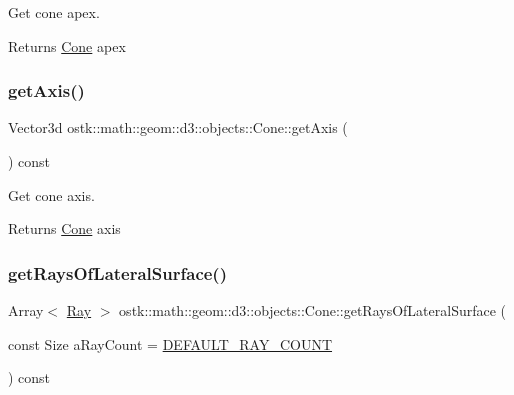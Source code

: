 Get cone apex. 

\begin{DoxyReturn}{Returns}
\hyperlink{classostk_1_1math_1_1geom_1_1d3_1_1objects_1_1_cone}{Cone} apex 
\end{DoxyReturn}
\mbox{\label{classostk_1_1math_1_1geom_1_1d3_1_1objects_1_1_cone_a061a6572fea78dcd22b4466a57bd1b6b}} 
\subsubsection{\texorpdfstring{get\+Axis()}{getAxis()}}
{\footnotesize\ttfamily Vector3d ostk\+::math\+::geom\+::d3\+::objects\+::\+Cone\+::get\+Axis (\begin{DoxyParamCaption}{ }\end{DoxyParamCaption}) const}



Get cone axis. 

\begin{DoxyReturn}{Returns}
\hyperlink{classostk_1_1math_1_1geom_1_1d3_1_1objects_1_1_cone}{Cone} axis 
\end{DoxyReturn}
\mbox{\label{classostk_1_1math_1_1geom_1_1d3_1_1objects_1_1_cone_a8dc14bb0164c5bf0b2525aaa4c52ea5a}} 
\subsubsection{\texorpdfstring{get\+Rays\+Of\+Lateral\+Surface()}{getRaysOfLateralSurface()}}
{\footnotesize\ttfamily Array$<$ \hyperlink{classostk_1_1math_1_1geom_1_1d3_1_1objects_1_1_ray}{Ray} $>$ ostk\+::math\+::geom\+::d3\+::objects\+::\+Cone\+::get\+Rays\+Of\+Lateral\+Surface (\begin{DoxyParamCaption}\item[{const Size}]{a\+Ray\+Count = {\ttfamily \hyperlink{_cone_8hpp_a95759f940e1d5e70e977d66fa8fcb5ec}{D\+E\+F\+A\+U\+L\+T\+\_\+\+R\+A\+Y\+\_\+\+C\+O\+U\+NT}} }\end{DoxyParamCaption}) const}



